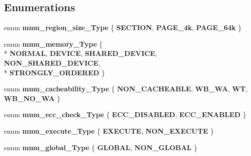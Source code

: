 \subsection*{Enumerations}
\begin{DoxyCompactItemize}
\item 
enum {\bfseries mmu\+\_\+region\+\_\+size\+\_\+\+Type} \{ {\bfseries S\+E\+C\+T\+I\+ON}, 
{\bfseries P\+A\+G\+E\+\_\+4k}, 
{\bfseries P\+A\+G\+E\+\_\+64k}
 \}\hypertarget{group___m_m_u___functions_gab184b824a6d7cb728bd46c6abcd0c21a}{}\label{group___m_m_u___functions_gab184b824a6d7cb728bd46c6abcd0c21a}

\item 
enum {\bfseries mmu\+\_\+memory\+\_\+\+Type} \{ \\*
{\bfseries N\+O\+R\+M\+AL}, 
{\bfseries D\+E\+V\+I\+CE}, 
{\bfseries S\+H\+A\+R\+E\+D\+\_\+\+D\+E\+V\+I\+CE}, 
{\bfseries N\+O\+N\+\_\+\+S\+H\+A\+R\+E\+D\+\_\+\+D\+E\+V\+I\+CE}, 
\\*
{\bfseries S\+T\+R\+O\+N\+G\+L\+Y\+\_\+\+O\+R\+D\+E\+R\+ED}
 \}\hypertarget{group___m_m_u___functions_ga83ac8de9263f89879079da521e86d5f2}{}\label{group___m_m_u___functions_ga83ac8de9263f89879079da521e86d5f2}

\item 
enum {\bfseries mmu\+\_\+cacheability\+\_\+\+Type} \{ {\bfseries N\+O\+N\+\_\+\+C\+A\+C\+H\+E\+A\+B\+LE}, 
{\bfseries W\+B\+\_\+\+WA}, 
{\bfseries WT}, 
{\bfseries W\+B\+\_\+\+N\+O\+\_\+\+WA}
 \}\hypertarget{group___m_m_u___functions_ga11c86b7b193efb2c59b6a2179a02f584}{}\label{group___m_m_u___functions_ga11c86b7b193efb2c59b6a2179a02f584}

\item 
enum {\bfseries mmu\+\_\+ecc\+\_\+check\+\_\+\+Type} \{ {\bfseries E\+C\+C\+\_\+\+D\+I\+S\+A\+B\+L\+ED}, 
{\bfseries E\+C\+C\+\_\+\+E\+N\+A\+B\+L\+ED}
 \}\hypertarget{group___m_m_u___functions_ga06d94c0eaa22d713636acaff81485409}{}\label{group___m_m_u___functions_ga06d94c0eaa22d713636acaff81485409}

\item 
enum {\bfseries mmu\+\_\+execute\+\_\+\+Type} \{ {\bfseries E\+X\+E\+C\+U\+TE}, 
{\bfseries N\+O\+N\+\_\+\+E\+X\+E\+C\+U\+TE}
 \}\hypertarget{group___m_m_u___functions_ga2fe1157deda82e66b9a1b19772309b63}{}\label{group___m_m_u___functions_ga2fe1157deda82e66b9a1b19772309b63}

\item 
enum {\bfseries mmu\+\_\+global\+\_\+\+Type} \{ {\bfseries G\+L\+O\+B\+AL}, 
{\bfseries N\+O\+N\+\_\+\+G\+L\+O\+B\+AL}
 \}\hypertarget{group___m_m_u___functions_ga04160605fbe20914c8ef020430684a30}{}\label{group___m_m_u___functions_ga04160605fbe20914c8ef020430684a30}


\end{DoxyCompactItemize}
